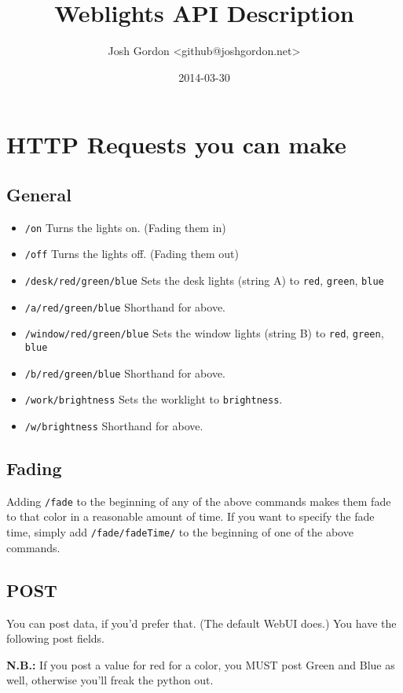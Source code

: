 \documentclass[11pt]{article}
\author{Josh Gordon <github@joshgordon.net>}
\date{2014-03-30}
\title{Weblights API Description}
\begin{document}
\maketitle

\section{HTTP Requests you can make}
\label{sec-1}

\subsection{General}
\label{sec-1-1}
\begin{itemize}
\item \texttt{/on} Turns the lights on. (Fading them in)
\item \texttt{/off} Turns the lights off. (Fading them out)
\item \texttt{/desk/red/green/blue} Sets the desk lights (string A) to \texttt{red}, \texttt{green}, \texttt{blue}
\item \texttt{/a/red/green/blue} Shorthand for above.
\item \texttt{/window/red/green/blue} Sets the window lights (string B) to \texttt{red}, \texttt{green}, \texttt{blue}
\item \texttt{/b/red/green/blue} Shorthand for above.
\item \texttt{/work/brightness} Sets the worklight to \texttt{brightness}.
\item \texttt{/w/brightness} Shorthand for above.
\end{itemize}
\subsection{Fading}
\label{sec-1-2}
Adding \texttt{/fade} to the beginning of any of the above commands makes
them fade to that color in a reasonable amount of time. If you want to
specify the fade time, simply add \texttt{/fade/fadeTime/} to the beginning
of one of the above commands. 

\subsection{POST}
\label{sec-1-3}
You can post data, if you'd prefer that. (The default WebUI does.) You
have the following post fields. 

\textbf{N.B.:} If you post a value for red for a color, you MUST post Green
and Blue as well, otherwise you'll freak the python out.
\end{document}
